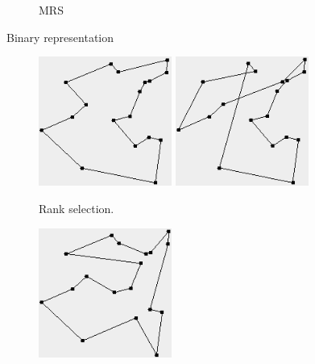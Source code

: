 \documentclass[10pt,a4paper,openbib]{article}
\begin{document}
\begin{multicols}{2}
\begin{figure}[H]
\begin{center}
\begin{subfigure}[b]{0.23\textwidth}
        \caption{MRS}
        \label{fig:cities18GraphBinarytrue}
    \end{subfigure}  
    \caption{Binary representation}
    \label{fig:cities18GraphBinary}
\end{center}
\end{figure}




\begin{figure}[H]
\begin{center}
    \begin{subfigure}[b]{0.23\textwidth}
        \includegraphics[width=0.48\textwidth]{images/result3/Pathfalse2.png}
        \includegraphics[width=0.48\textwidth]{images/result3/Pathfalse9.png}
        \caption{Rank selection.}
        \label{fig:cities18GraphPathfalse}
    \end{subfigure}
    \begin{subfigure}[b]{0.23\textwidth}
        \includegraphics[width=0.48\textwidth]{images/result3/Pathtrue2.png}

\end{subfigure}
\end{center}
\end{figure}
\end{multicols}
\end{document}
